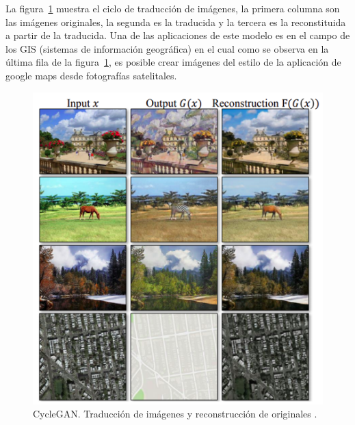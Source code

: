 La figura~\ref{fig:gan5} muestra el ciclo de traducción de imágenes, la primera columna son las imágenes originales, la segunda es la traducida y la tercera es la reconstituida a partir de la traducida. Una de las aplicaciones de este modelo es en el campo de los GIS (sistemas de información geográfica) en el cual como se observa en la última fila de la figura~\ref{fig:gan5}, es posible crear imágenes del estilo de la aplicación de google maps desde fotografías satelitales.

\begin{figure}[th]
\centering
\includegraphics [scale = 0.85]{Figures/figura_13.PNG}
\decoRule
\caption[CycleGAN] {CycleGAN. Traducción de imágenes y reconstrucción de originales \parencite{r48}.}
\label{fig:gan5}
\end{figure}